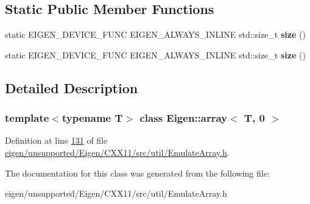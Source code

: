 \subsection*{Static Public Member Functions}
\begin{DoxyCompactItemize}
\item 
\mbox{\label{class_eigen_1_1array_3_01_t_00_010_01_4_a4e463b660fd3c56f600cf380e0f4f1aa}} 
static E\+I\+G\+E\+N\+\_\+\+D\+E\+V\+I\+C\+E\+\_\+\+F\+U\+NC E\+I\+G\+E\+N\+\_\+\+A\+L\+W\+A\+Y\+S\+\_\+\+I\+N\+L\+I\+NE std\+::size\+\_\+t {\bfseries size} ()
\item 
\mbox{\label{class_eigen_1_1array_3_01_t_00_010_01_4_a4e463b660fd3c56f600cf380e0f4f1aa}} 
static E\+I\+G\+E\+N\+\_\+\+D\+E\+V\+I\+C\+E\+\_\+\+F\+U\+NC E\+I\+G\+E\+N\+\_\+\+A\+L\+W\+A\+Y\+S\+\_\+\+I\+N\+L\+I\+NE std\+::size\+\_\+t {\bfseries size} ()
\end{DoxyCompactItemize}


\subsection{Detailed Description}
\subsubsection*{template$<$typename T$>$\newline
class Eigen\+::array$<$ T, 0 $>$}



Definition at line \hyperlink{eigen_2unsupported_2_eigen_2_c_x_x11_2src_2util_2_emulate_array_8h_source_l00131}{131} of file \hyperlink{eigen_2unsupported_2_eigen_2_c_x_x11_2src_2util_2_emulate_array_8h_source}{eigen/unsupported/\+Eigen/\+C\+X\+X11/src/util/\+Emulate\+Array.\+h}.



The documentation for this class was generated from the following file\+:\begin{DoxyCompactItemize}
\item 
eigen/unsupported/\+Eigen/\+C\+X\+X11/src/util/\+Emulate\+Array.\+h\end{DoxyCompactItemize}

